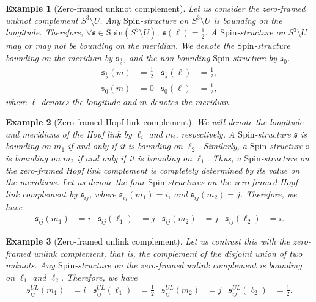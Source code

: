 \documentclass{article}
\newtheorem{example}{Example}[section]
\numberwithin{corollary}{theorem}
\numberwithin{corollary}{proposition}
\begin{document}
\begin{example}[Zero-framed unknot complement]
   Let us consider the zero-framed unknot complement $S^{3}\setminus U$. Any $\mathrm{Spin}$-structure on $S^{3}\setminus U$ is bounding on the longitude. Therefore, $\forall \mathfrak{s} \in \mathrm{Spin}(S^{3}\setminus U)$, $\mathfrak{s}(\ell)=\frac{1}{2}$. A $\mathrm{Spin}$-structure on $S^{3}\setminus U$ may or may not be bounding on the meridian. We denote the $\mathrm{Spin}$-structure bounding on the meridian by $\mathfrak{s}_{\frac{1}{2}}$, and the non-bounding $\mathrm{Spin}$-structure by $\mathfrak{s}_{0}$.
\begin{align}
    \mathfrak{s}_{\frac{1}{2}}(m) & = \frac{1}{2} & \mathfrak{s}_{\frac{1}{2}}(\ell) & = \frac{1    }{2}, \\
    \mathfrak{s}_{0}(m) & = 0 & \mathfrak{s}_{0}(\ell) & = \frac{1}{2},
\end{align}
where $\ell$ denotes the longitude and $m$ denotes the meridian. 
\end{example}
\begin{example}[Zero-framed Hopf link complement]
     We will denote the longitude and meridians of the Hopf link by $\ell_{i}$ and $m_{i}$, respectively. A $\mathrm{Spin}$-structure $\mathfrak{s}$ is bounding on $m_{1}$ if and only if it is bounding on $\ell_{2}$. Similarly, a $\mathrm{Spin}$-structure $\mathfrak{s}$ is bounding on $m_{2}$ if and only if it is bounding on $\ell_{1}$. Thus, a $\mathrm{Spin}$-structure on the zero-framed Hopf link complement is completely determined by its value on the meridians. Let us denote the four $\mathrm{Spin}$-structures on the zero-framed Hopf link complement by $\mathfrak{s}_{ij}$, where $\mathfrak{s}_{ij}(m_{1})= i$, and $\mathfrak{s}_{ij}(m_{2})= j$. Therefore, we have 
\begin{align}
   \mathfrak{s}_{ij}(m_{1}) &= i & \mathfrak{s}_{ij}(\ell_{1}) &= j & \mathfrak{s}_{ij}(m_{2}) &= j & \mathfrak{s}_{ij}(\ell_{2}) &= i.
\end{align}
\end{example}
\begin{example}[Zero-framed unlink complement]
    Let us contrast this with the zero-framed unlink complement, that is, the complement of the disjoint union of two unknots. Any $\mathrm{Spin}$-structure on the zero-framed unlink complement is bounding on $\ell_{1}$ and $\ell_{2}$. Therefore, we have
\begin{align}
    \mathfrak{s}^{UL}_{ij}(m_{1}) &= i & \mathfrak{s}^{UL}_{ij}(\ell_{1}) &= \frac{1}{2} & \mathfrak{s}^{UL}_{ij}(m_{2}) &= j & \mathfrak{s}^{UL}_{ij}(\ell_{2}) &= \frac{1}{2}.
\end{align}
\end{example}
\end{document}

